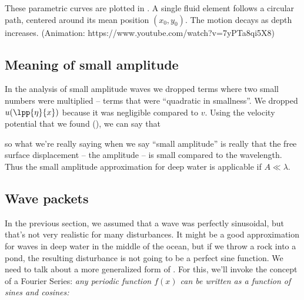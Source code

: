 \documentclass[12pt]{book}
\renewcommand{\and}{{\xspace \mathrm{and}\xspace}}
\begin{document}
These parametric curves are plotted in .  A single fluid element follows a circular path, centered around its mean position $(x_0,y_0)$. The motion decays as depth increases. (Animation: https://www.youtube.com/watch?v=7yPTa8qi5X8)



\subsection{Meaning of small amplitude}
In the analysis of small amplitude waves we dropped terms where two small numbers were multiplied -- terms that were ``quadratic in smallness''. We dropped $u(\lpp{\eta}{x})$ because it was  negligible compared to $v$.  Using the velocity potential that we found (), we can say that
\unnumeq{\abs{u}=\abs{\pp{\phi}{x}}\sim A\omega\qquad\and\qquad \abs{v} = \abs{\pp{\phi}{x}} \sim A\omega }

so what we're really saying when we say ``small amplitude'' is really that the free surface displacement -- the amplitude --  is small compared to the wavelength.  Thus the small amplitude approximation for deep water is applicable if $A\ll\lambda$.


\subsection{Wave packets}

In the previous section, we assumed that a wave was perfectly sinusoidal, but that's not very realistic for many disturbances.  It might be a good approximation for waves in deep water in the middle of the ocean, but if we throw a rock into a pond, the resulting disturbance is not going to be a perfect sine function.  We need to talk about a more generalized form of .  For this, we'll invoke the concept of a Fourier Series: \textit{any periodic function $f(x)$ can be written as a function of sines and cosines:}
\end{document}
